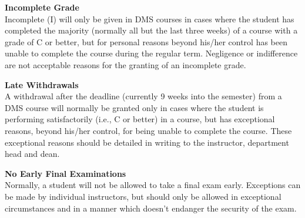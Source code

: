 \documentclass[12pt]{article}
\renewcommand{\emph}[1]{\textsf{\textbf{#1}}}
\newcommand{\localhead}[1]{\par\smallskip\textbf{#1}\nobreak\\}%
\def\subheading#1{\localhead{\emph{#1}}}
\begin{document}




\subheading{Incomplete Grade} 
Incomplete (I) will only be given in
  DMS courses in cases where
  the student has completed the majority (normally all but the last
  three weeks) of a course with a grade of C or better, but for
  personal reasons beyond his/her control has been unable to complete
  the course during the regular term. Negligence or indifference are
  not acceptable reasons for the granting of an incomplete
  grade. 

\subheading{Late Withdrawals} 
A withdrawal after the deadline
  (currently 9 weeks into the semester) from a DMS course will
  normally be granted only in cases where the student is performing
  satisfactorily (i.e., C or better) in a course, but has exceptional
  reasons, beyond his/her control, for being unable to complete the
  course. These exceptional reasons should be detailed in writing to
  the instructor, department head and dean.

\subheading{No Early Final Examinations}
 Normally, a student will not be
  allowed to take a final exam early. Exceptions can be made by
  individual instructors, but should only be allowed in exceptional
  circumstances and in a manner which doesn't endanger the security of
  the exam.

\pagebreak

 
\end{document}
